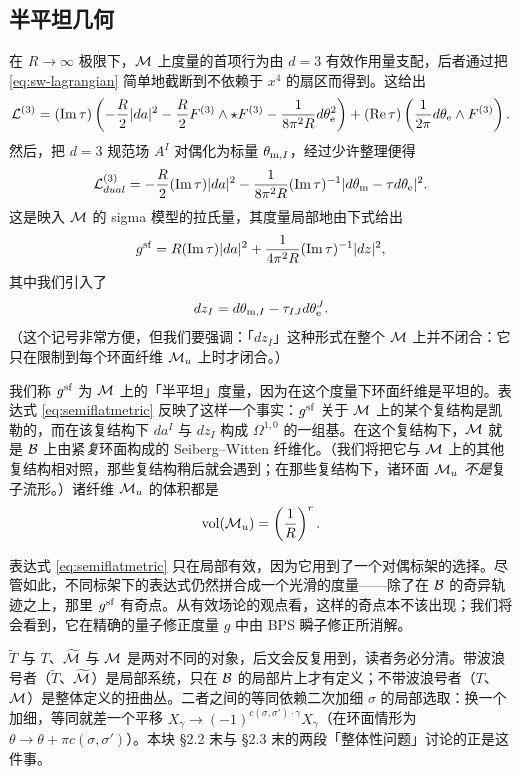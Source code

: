 \subsection{半平坦几何}
\label{sec:semiflat}

在 $R \to \infty$ 极限下，$\mathcal{M}$ 上度量的首项行为由 $d=3$ 有效作用量支配，后者通过把 \eqref{eq:sw-lagrangian} 简单地截断到不依赖于 $x^4$ 的扇区而得到。这给出
\begin{equation}
\mathcal{L}^{(3)} = (\operatorname{Im} \tau) \left(- \frac{R}{2} \lvert da \rvert^2 - \frac{R}{2}
F^{(3)} \wedge \star F^{(3)} -  \frac{1}{8 \pi^2 R} d\theta_{\mathrm{e}}^2
\right) +  (\operatorname{Re} \tau) \left(\frac{1}{2\pi} d \theta_{\mathrm{e}} \wedge
F^{(3)}\right).
\end{equation}
然后，把 $d=3$ 规范场 $A^I$ 对偶化为标量 $\theta_{\mathrm{m},I}$，经过少许整理便得
\begin{equation}
\mathcal{L}^{(3)}_{dual} = - \frac{R}{2} (\operatorname{Im} \tau) \lvert da \rvert^2 - \frac{1}{8 \pi^2 R} (\operatorname{Im} \tau)^{-1} \lvert d \theta_{\mathrm{m}} - \tau d\theta_{\mathrm{e}} \rvert^2.
\end{equation}
这是映入 $\mathcal{M}$ 的 sigma 模型的拉氏量，其度量局部地由下式给出
\begin{equation} \label{eq:semiflatmetric}
g^{\mathrm{sf}} = R (\operatorname{Im} \tau) \lvert da \rvert^2 + \frac{1}{4 \pi^2 R} (\operatorname{Im} \tau)^{-1} \lvert dz \rvert^2,
\end{equation}
其中我们引入了
\begin{equation}
dz_I = d \theta_{\mathrm{m},I} - \tau_{IJ} d \theta_{\mathrm{e}}^J.
\end{equation}
（这个记号非常方便，但我们要强调：「$dz_I$」这种形式在整个 $\mathcal{M}$ 上并不闭合：它只在限制到每个环面纤维 $\mathcal{M}_u$ 上时才闭合。）

我们称 $g^{\mathrm{sf}}$ 为 $\mathcal{M}$ 上的「半平坦」度量，因为在这个度量下环面纤维是平坦的。表达式 \eqref{eq:semiflatmetric} 反映了这样一个事实：$g^{\mathrm{sf}}$ 关于 $\mathcal{M}$ 上的某个复结构是凯勒的，而在该复结构下 $da^I$ 与 $dz_I$ 构成 $\Omega^{1,0}$ 的一组基。在这个复结构下，$\mathcal{M}$ 就是 $\mathcal{B}$ 上由紧\emph{复}环面构成的 Seiberg--Witten 纤维化。（我们将把它与 $\mathcal{M}$ 上的其他复结构相对照，那些复结构稍后就会遇到；在那些复结构下，诸环面 $\mathcal{M}_u$ \emph{不是}复子流形。）诸纤维 $\mathcal{M}_u$ 的体积都是
\begin{equation}
\operatorname{vol}(\mathcal{M}_u) = \left(\frac{1}{R}\right)^r.
\end{equation}

表达式 \eqref{eq:semiflatmetric} 只在局部有效，因为它用到了一个对偶标架的选择。尽管如此，不同标架下的表达式仍然拼合成一个光滑的度量——除了在 $\mathcal{B}$ 的奇异轨迹之上，那里 $g^{\mathrm{sf}}$ 有奇点。从有效场论的观点看，这样的奇点本不该出现；我们将会看到，它在精确的量子修正度量 $g$ 中由 BPS 瞬子修正所消解。

\begin{yizhu}
$\tilde{T}$ 与 $T$、$\widetilde{\mathcal{M}}$ 与 $\mathcal{M}$ 是两对不同的对象，后文会反复用到，读者务必分清。带波浪号者（$\tilde{T}$、$\widetilde{\mathcal{M}}$）是局部系统，只在 $\mathcal{B}$ 的局部片上才有定义；不带波浪号者（$T$、$\mathcal{M}$）是整体定义的扭曲丛。二者之间的等同依赖二次加细 $\sigma$ 的局部选取：换一个加细，等同就差一个平移 $X_\gamma \to (-1)^{c(\sigma,\sigma')\cdot\gamma}X_\gamma$（在环面情形为 $\theta \to \theta+\pi c(\sigma,\sigma')$）。本块 §2.2 末与 §2.3 末的两段「整体性问题」讨论的正是这件事。
\end{yizhu}
